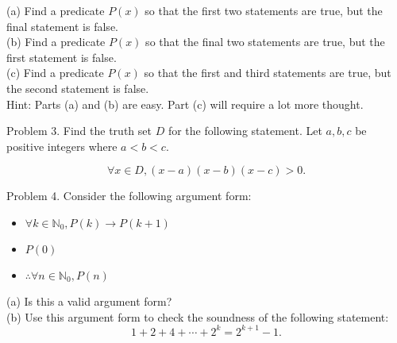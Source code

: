 \documentclass[16 pt]{amsart}
\theoremstyle{definition}
\theoremstyle{remark}
\numberwithin{equation}{subsection}
\begin{document}
(a) Find a predicate $P(x)$ so that the first two statements are true, but the final statement is false.\\

(b) Find a predicate $P(x)$ so that the final two statements are true, but the first statement is false.\\

(c) Find a predicate $P(x)$ so that the first and third statements are true, but the second statement is false.\\

Hint: Parts (a) and (b) are easy.  Part (c) will require a lot more thought.

\newpage

Problem 3. Find the truth set $D$ for the following statement. Let $a,b,c$ be positive integers where $a<b<c$.

\[
\forall x\in D, (x-a)(x-b)(x-c)>0.
\]  

\newpage

Problem 4. Consider the following argument form:

\begin{itemize}
\item $\forall k\in \mathbb{N}_0, P(k) \rightarrow P(k+1)$\\
\item $P(0)$\\
\item $\therefore \forall n\in \mathbb{N}_0, P(n)$
\end{itemize}

(a) Is this a valid argument form?\\

(b) Use this argument form to check the soundness of the following statement:
\[
1 + 2 + 4 + \cdots + 2^k = 2^{k+1} - 1.
\]
\end{document}
